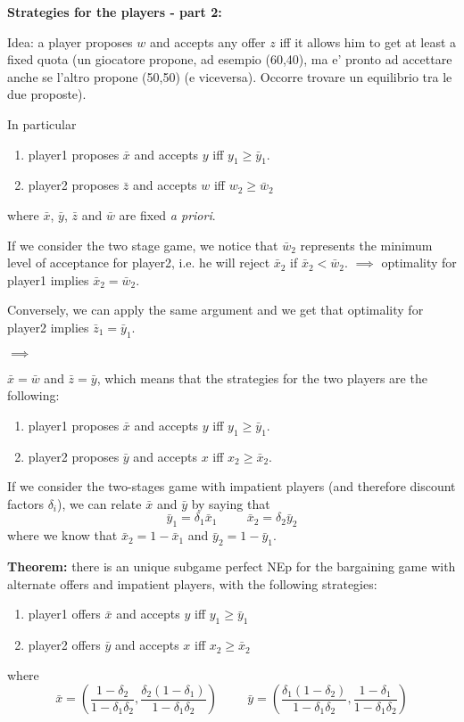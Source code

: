 \bigskip
\noindent \textbf{Strategies for the players - part 2:}

\noindent Idea: a player proposes $w$ and accepts any offer $z$ iff it allows him to get at least a fixed quota (un giocatore propone, ad esempio (60,40), ma e' pronto ad 
accettare anche se l'altro propone (50,50) (e viceversa). Occorre trovare 
un equilibrio tra le due proposte).

\noindent In particular
\begin{enumerate}
	\item player1 proposes $\bar{x}$ and accepts $y$ iff $y_1 \geq \bar{y}_1$.
	\item player2 proposes $\bar{z}$ and accepts $w$ iff $w_2 \geq \bar{w}_2$
\end{enumerate}
where $\bar{x}$, $\bar{y}$, $\bar{z}$ and $\bar{w}$ are fixed \textit{a priori}.

\noindent If we consider the two stage game, we notice that $\bar{w}_2$ represents the minimum level of acceptance for player2, i.e. he will reject $\bar{x}_2$ if $\bar{x}_2 < \bar{w}_2$. $\implies$ optimality for player1 implies $\bar{x}_2 = \bar{w}_2$.

\noindent Conversely, we can apply the same argument and we get that optimality for player2 implies $\bar{z}_1 = \bar{y}_1$.

\noindent $\implies$

\noindent $\bar{x} = \bar{w}$ and $\bar{z} = \bar{y}$, which means that the strategies for the two players are the following:
\begin{enumerate}
	\item player1 proposes $\bar{x}$ and accepts $y$ iff $y_1 \geq \bar{y}_1$.
	\item player2 proposes $\bar{y}$ and accepts $x$ iff $x_2 \geq \bar{x}_2$.
\end{enumerate}

\noindent If we consider the two-stages game with impatient players (and therefore discount factors $\delta_i$), we can relate $\bar{x}$ and $\bar{y}$ by saying that
\[
	\bar{y}_1 = \delta_1\bar{x}_1 \hspace{1cm} \bar{x}_2 = \delta_2\bar{y}_2
\]
where we know that $\bar{x}_2 = 1 - \bar{x}_1$ and $\bar{y}_2 = 1 - \bar{y}_1$. 

\bigskip
\noindent \textbf{Theorem:} there is an unique subgame perfect NEp for the bargaining game with alternate offers and impatient players, with the following strategies:
\begin{enumerate}
	\item player1 offers $\bar{x}$ and accepts $y$ iff $y_1 \geq \bar{y}_1$
	\item player2 offers $\bar{y}$ and accepts $x$ iff $x_2 \geq \bar{x}_2$
\end{enumerate}
where
\[
	\bar{x} = \left( \frac{1-\delta_2}{1-\delta_1\delta_2}, 
					     \frac{\delta_2(1-\delta_1)}{1-\delta_1\delta_2} \right)
	\hspace{1cm}	
	\bar{y} = \left( \frac{\delta_1(1-\delta_2)}{1-\delta_1\delta_2},
	 					\frac{1-\delta_1}{1-\delta_1\delta_2} \right)
\]

